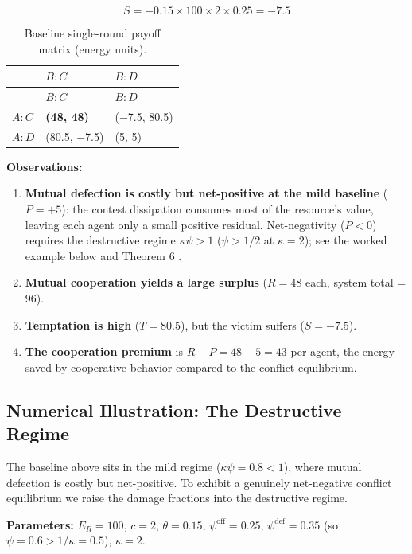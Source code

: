 \documentclass[11pt]{article}
\theoremstyle{plain}
\theoremstyle{definition}
\theoremstyle{remark}
\let\origsubsection\subsection
\renewcommand{\subsection}{\needspace{7\baselineskip}\origsubsection}
\providecommand{\tightlist}{%
  \setlength{\itemsep}{0pt}\setlength{\parskip}{0pt}}
\begin{document}
\[S = -0.15 \times 100 \times 2 \times 0.25 = -7.5\]

\begin{longtable}[]{@{}lll@{}}
\caption{Baseline single-round payoff matrix (energy
units).}\tabularnewline
\toprule\noalign{}
& \(B: C\) & \(B: D\) \\
\midrule\noalign{}
\endfirsthead
\toprule\noalign{}
& \(B: C\) & \(B: D\) \\
\midrule\noalign{}
\endhead
\bottomrule\noalign{}
\endlastfoot
\(A: C\) & \textbf{(48, 48)} & (−7.5, 80.5) \\
\(A: D\) & (80.5, −7.5) & (5, 5) \\
\end{longtable}

\textbf{Observations:}

\begin{enumerate}
\def\labelenumi{\arabic{enumi}.}
\tightlist
\item
  \textbf{Mutual defection is costly but net-positive at the mild
  baseline} (\(P = +5\)): the contest dissipation consumes most of the
  resource's value, leaving each agent only a small positive residual.
  Net-negativity (\(P < 0\)) requires the destructive regime
  \(\kappa\psi > 1\) (\(\psi > 1/2\) at \(\kappa = 2\)); see the worked
  example below and Theorem 6 \citep{TC-IV}.
\item
  \textbf{Mutual cooperation yields a large surplus} (\(R = 48\) each,
  system total = 96).
\item
  \textbf{Temptation is high} (\(T = 80.5\)), but the victim suffers
  (\(S = -7.5\)).
\item
  \textbf{The cooperation premium} is \(R - P = 48 - 5 = 43\) per agent,
  the energy saved by cooperative behavior compared to the conflict
  equilibrium.
\end{enumerate}

\subsection{Numerical Illustration: The Destructive
Regime}\label{numerical-illustration-the-destructive-regime}

The baseline above sits in the mild regime (\(\kappa\psi = 0.8 < 1\)),
where mutual defection is costly but net-positive. To exhibit a
genuinely net-negative conflict equilibrium we raise the damage
fractions into the destructive regime.

\textbf{Parameters:} \(E_R = 100\), \(c = 2\), \(\theta = 0.15\),
\(\psi^{\text{off}} = 0.25\), \(\psi^{\text{def}} = 0.35\) (so
\(\psi = 0.6 > 1/\kappa = 0.5\)), \(\kappa = 2\).
\end{document}
